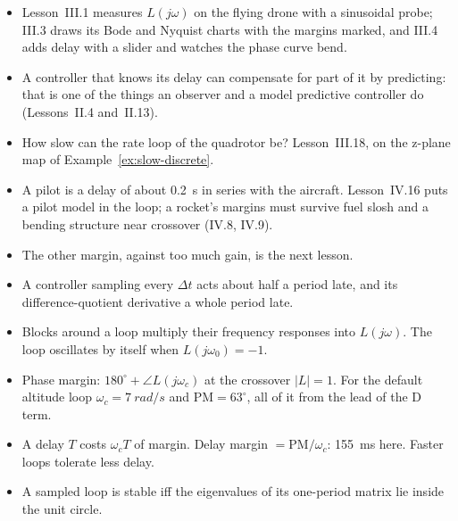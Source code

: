 \begin{lookahead}
\begin{itemize}[leftmargin=1.2em]
  \item Lesson~III.1 measures $L(j\omega)$ on the flying drone with a sinusoidal probe; III.3 draws its Bode and Nyquist charts with the margins marked, and III.4 adds delay with a slider and watches the phase curve bend.
  \item A controller that knows its delay can compensate for part of it by predicting: that is one of the things an observer and a model predictive controller do (Lessons~II.4 and~II.13).
  \item How slow can the rate loop of the quadrotor be? Lesson~III.18, on the z-plane map of Example~\ref{ex:slow-discrete}.
  \item A pilot is a delay of about \SI{0.2}{s} in series with the aircraft. Lesson~IV.16 puts a pilot model in the loop; a rocket's margins must survive fuel slosh and a bending structure near crossover (IV.8, IV.9).
  \item The other margin, against too much gain, is the next lesson.
\end{itemize}
\end{lookahead}

\begin{remember}
\begin{itemize}
  \item A controller sampling every $\Delta t$ acts about half a period late, and its difference-quotient derivative a whole period late.
  \item Blocks around a loop multiply their frequency responses into $L(j\omega)$. The loop oscillates by itself when $L(j\omega_0) = -1$.
  \item Phase margin: $180^\circ + \angle L(j\omega_c)$ at the crossover $|L| = 1$. For the default altitude loop $\omega_c = \SI{7}{rad/s}$ and $\mathrm{PM} = 63^\circ$, all of it from the lead of the D term.
  \item A delay $T$ costs $\omega_cT$ of margin. Delay margin $= \mathrm{PM}/\omega_c$: \SI{155}{ms} here. Faster loops tolerate less delay.
  \item A sampled loop is stable iff the eigenvalues of its one-period matrix lie inside the unit circle.
\end{itemize}
\end{remember}

